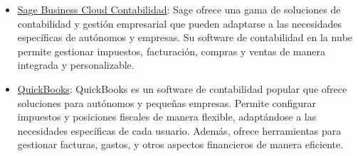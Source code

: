 \begin{itemize}
    \item \href{https://www.sage.com/es-es/software-contabilidad/}{Sage Business Cloud Contabilidad}: Sage ofrece una gama de soluciones de contabilidad y gestión empresarial que pueden adaptarse a las necesidades específicas de autónomos y empresas. Su software de contabilidad en la nube permite gestionar impuestos, facturación, compras y ventas de manera integrada y personalizable.

    \item \href{https://quickbooks.intuit.com/es/}{QuickBooks}: QuickBooks es un software de contabilidad popular que ofrece soluciones para autónomos y pequeñas empresas. Permite configurar impuestos y posiciones fiscales de manera flexible, adaptándose a las necesidades específicas de cada usuario. Además, ofrece herramientas para gestionar facturas, gastos, y otros aspectos financieros de manera eficiente.
\end{itemize}

